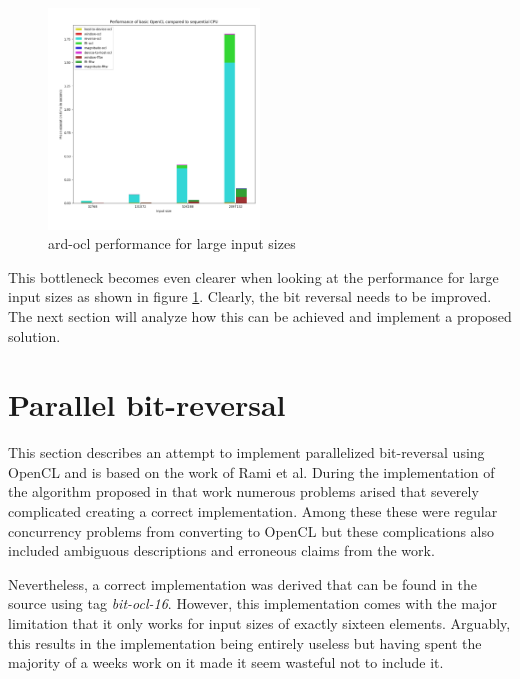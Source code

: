 \documentclass[conference]{IEEEtran}
\begin{document}
\begin{center}
	\begin{figure}[H]
		\includegraphics[width=0.5\textwidth]{resources/images/ard-ocl-high.png}
		\captionsetup{justification=centering}
		\caption{ard-ocl performance for large input sizes}
		\label{fig:ardoclhigh}
	\end{figure}
\end{center}

This bottleneck becomes even clearer when looking at the performance for
large input sizes as shown in figure \ref{fig:ardoclhigh}. Clearly, the bit
reversal needs to be improved. The next section will analyze how this can be
achieved and implement a proposed solution.

\section{Parallel bit-reversal}

This section describes an attempt to implement parallelized bit-reversal using
OpenCL and is based on the work of Rami et al\cite{parreverse}. During
the implementation of the algorithm proposed in that work numerous problems
arised that severely complicated creating a correct implementation. Among these
these were regular concurrency problems from converting to OpenCL but these
complications also included ambiguous descriptions and erroneous claims from
the work.

Nevertheless, a correct implementation was derived that can be found in the
source using tag \textit{bit-ocl-16}. However, this implementation comes
with the major limitation that it only works for input sizes of exactly
sixteen elements. Arguably, this results in the implementation being entirely
useless but having spent the majority of a weeks work on it made it seem
wasteful not to include it.
\end{document}
